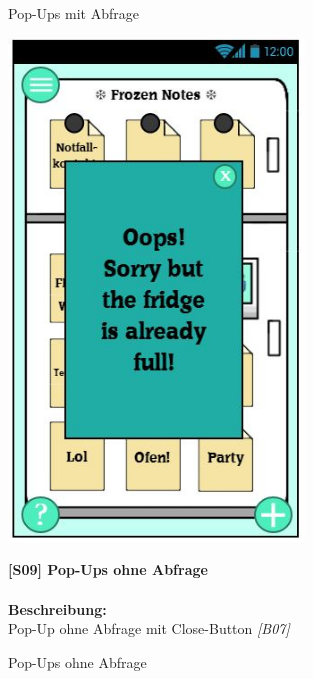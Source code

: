 \documentclass[a4paper]{scrreprt}
\begin{document}
\begin{figure}[h!]
\begin{minipage}[t]{0.45\linewidth}
    			\caption{Pop-Ups mit Abfrage}
    			\label{fig:figure1}
    			
    		\end{minipage}
    	\end{figure}
    
    	\vspace{15mm}
    	
    	\begin{figure}[h!]
    		\begin{minipage}[b]{0.4\linewidth}
    			\flushright
    			\centering
    			\includegraphics[width=0.7\textwidth]{fridget_error.JPG}
    			\caption{Pop-Ups ohne Abfrage}
    			\label{fig:figure1}
    			\vspace{1mm}
    		\end{minipage}
    		\hspace{0.5cm}
    		\begin{minipage}[b]{0.55\linewidth}
    			\flushleft
    			\textbf{{[}S09{]} Pop-Ups ohne Abfrage}\\
    			\hfill
    			\\\textbf{Beschreibung:} \\
    			Pop-Up ohne Abfrage mit Close-Button \textit{{[}B07{]}}\\
    			

\end{minipage}
\end{figure}
\end{document}
